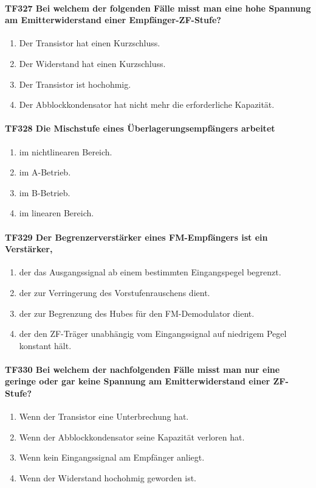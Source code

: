 \documentclass[8pt]{article}
\begin{document}
\paragraph*{TF327 Bei welchem der folgenden Fälle misst man eine hohe Spannung am Emitterwiderstand einer Empfänger-ZF-Stufe?}
\begin{enumerate}[nolistsep,label=\Alph*]
\item Der Transistor hat einen Kurzschluss.
\item Der Widerstand hat einen Kurzschluss.
\item Der Transistor ist hochohmig.
\item Der Abblockkondensator hat nicht mehr die erforderliche Kapazität.
\end{enumerate}

\paragraph*{TF328 Die Mischstufe eines Überlagerungsempfängers arbeitet}
\begin{enumerate}[nolistsep,label=\Alph*]
\item im nichtlinearen Bereich.
\item im A-Betrieb.
\item im B-Betrieb.
\item im linearen Bereich.
\end{enumerate}

\paragraph*{TF329 Der Begrenzerverstärker eines FM-Empfängers ist ein Verstärker,}
\begin{enumerate}[nolistsep,label=\Alph*]
\item der das Ausgangssignal ab einem bestimmten Eingangspegel begrenzt.
\item der zur Verringerung des Vorstufenrauschens dient.
\item der zur Begrenzung des Hubes für den FM-Demodulator dient.
\item der den ZF-Träger unabhängig vom Eingangssignal auf niedrigem Pegel konstant hält.
\end{enumerate}

\paragraph*{TF330 Bei welchem der nachfolgenden Fälle misst man nur eine geringe oder gar keine Spannung am Emitterwiderstand einer ZF-Stufe?}
\begin{enumerate}[nolistsep,label=\Alph*]
\item Wenn der Transistor eine Unterbrechung hat.
\item Wenn der Abblockkondensator seine Kapazität verloren hat.
\item Wenn kein Eingangssignal am Empfänger anliegt.
\item Wenn der Widerstand hochohmig geworden ist. 
\end{enumerate}
\end{document}
